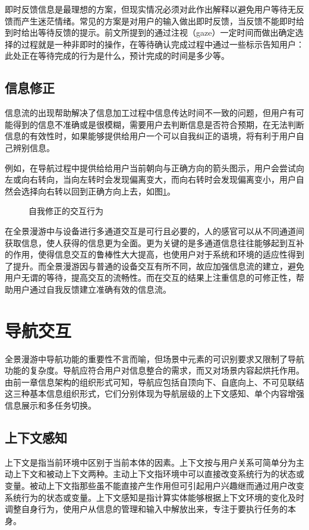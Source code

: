 即时反馈信息是最理想的方案，但现实情况必须对此作出解释以避免用户等待无反馈而产生迷茫情绪。常见的方案是对用户的输入做出即时反馈，当反馈不能即时给到时给出等待反馈的提示。前文所提到的通过注视（gaze）一定时间而做出确定选择的过程就是一种非即时的操作，在等待确认完成过程中通过一些标示告知用户：此处正在等待完成的行为是什么，预计完成的时间是多少等。

\subsection{信息修正}
信息流的出现帮助解决了信息加工过程中信息传达时间不一致的问题，但用户有可能得到的信息不准确或是很模糊，需要用户去判断信息是否符合预期，在无法判断信息的有效性时，如果能够提供给用户一个可以自我纠正的语境，将有利于用户自己辨别信息。

例如，在导航过程中提供给给用户当前朝向与正确方向的箭头图示，用户会尝试向左或向右转向，当向左转时会发现偏离变大，而向右转时会发现偏离变小，用户自然会选择向右转以回到正确方向上去，如图\ref{fig:correct}。

\begin{figure}[htp]
\centering
{}
\caption{自我修正的交互行为}
\label{fig:correct}
\end{figure}

在全景漫游中与设备进行多通道交互是可行且必要的，人的感官可以从不同通道间获取信息，使人获得的信息更为全面。更为关键的是多通道信息往往能够起到互补的作用，使得信息交互的鲁棒性大大提高，也使用户对于系统和环境的适应性得到了提升。而全景漫游因与普通的设备交互有所不同，故应加强信息流的建立，避免用户无谓的等待，提高交互的流畅性。而在交互的结果上注重信息的可修正性，帮助用户通过自我反馈建立准确有效的信息流。

\section{导航交互}
全景漫游中导航功能的重要性不言而喻，但场景中元素的可识别要求又限制了导航功能的复杂度。导航应符合用户对信息整合的需求，而又对场景内容起烘托作用。由前一章信息架构的组织形式可知，导航应包括自顶向下、自底向上、不可见联结这三种基本信息组织形式，它们分别体现为导航层级的上下文感知、单个内容增强信息展示和多任务切换。

\subsection{上下文感知}
上下文是指当前环境中区别于当前本体的因素。上下文按与用户关系可简单分为主动上下文和被动上下文两种。主动上下文指环境中可以直接改变系统行为的状态或变量。被动上下文指那些虽不能直接产生作用但可引起用户兴趣继而通过用户改变系统行为的状态或变量。上下文感知是指计算实体能够根据上下文环境的变化及时调整自身行为，使用户从信息的管理和输入中解放出来，专注于要执行任务的本身。

